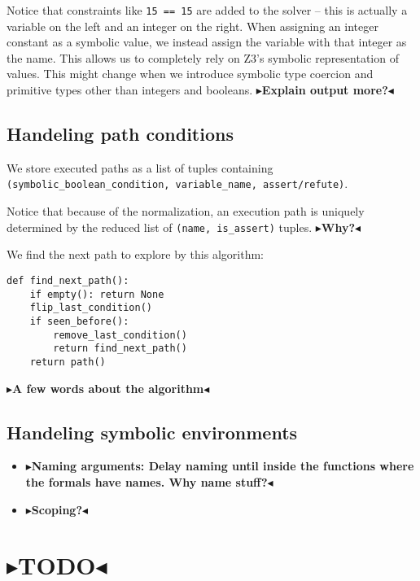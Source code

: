 \documentclass[11pt]{report}
\newcommand{\todo}[1]{{\color[rgb]{.5,0,0}\textbf{$\blacktriangleright$#1$\blacktriangleleft$}}}
\begin{document}
Notice that constraints like \verb|15 == 15| are added to the solver
-- this is actually a variable on the left and an integer on the
right. When assigning an integer constant as a symbolic value, we
instead assign the variable with that integer as the name. This allows
us to completely rely on Z3's symbolic representation of values. This
might change when we introduce symbolic type coercion and primitive
types other than integers and booleans. \todo{Explain output more?}

\section{Handeling path conditions}
We store executed paths as a list of tuples containing \\
\verb|(symbolic_boolean_condition, variable_name, assert/refute)|.

Notice that because of the normalization, an execution path is
uniquely determined by the reduced list of \verb|(name, is_assert)|
tuples. \todo{Why?}

We find the next path to explore by this algorithm:
\begin{verbatim}
def find_next_path():
    if empty(): return None
    flip_last_condition()
    if seen_before():
        remove_last_condition()
        return find_next_path()
    return path()
\end{verbatim}

\todo{A few words about the algorithm}

\section{Handeling symbolic environments}
\begin{itemize}
\item \todo{Naming arguments: Delay naming until inside the functions
  where the formals have names. Why name stuff?}
\item \todo{Scoping?}
\end{itemize}


\chapter{\todo{TODO}}
\end{document}
